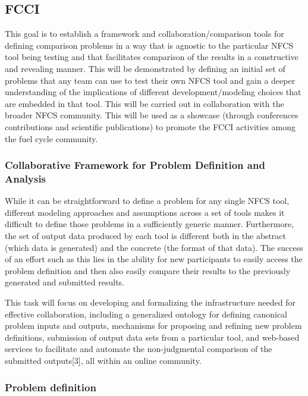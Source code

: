 
\subsection{FCCI}

This goal is to establish a framework and collaboration/comparison tools for
defining comparison problems in a way that is agnostic to the particular NFCS
tool being testing and that facilitates comparison of the results in a
constructive and revealing manner.  This will be demonstrated by defining an
initial set of problems that any team can use to test their own NFCS tool and
gain a deeper understanding of the implications of different
development/modeling choices that are embedded in that tool. This will be
carried out in collaboration with the broader NFCS community. This will be used
as a showcase (through conferences contributions and scientific publications) to
promote the FCCI activities among the fuel cycle community. 


\subsubsection{Collaborative Framework for Problem Definition and Analysis} 

While it can be straightforward to define a problem for any single NFCS tool,
different modeling approaches and assumptions across a set of tools makes it
difficult to define those problems in a sufficiently generic manner.
Furthermore, the set of output data produced by each tool is different both in
the abstract (which data is generated) and the concrete (the format of that
data).  The success of an effort such as this lies in the ability for new
participants to easily access the problem definition and then also easily
compare their results to the previously generated and submitted results.

This task will focus on developing and formalizing the infrastructure needed for
effective collaboration, including a generalized ontology for defining canonical
problem inputs and outputs, mechanisms for proposing and refining new problem
definitions, submission of output data sets from a particular tool, and
web-based services to facilitate and automate the non-judgmental comparison of
the submitted outputs[3], all within an online community.  


\subsubsection{Problem definition} 

